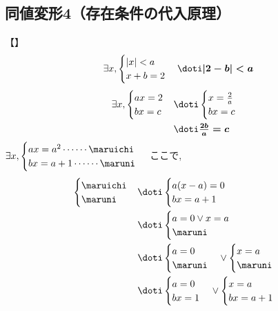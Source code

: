 \documentclass[10pt,fleqn,a4paper]{jsarticle}
\newcommand{\ans}[1]{\mbox{\boldmath{$#1$}}}
\newcommand{\theme}[1]{【\text{#1}】}
\begin{document}
\subsection{同値変形4（存在条件の代入原理）}
\noindent{}\theme{計算練習}\\
\kakkoichib\begin{align*}
  \exists x,\begin{cases}
    |x|<a\\
    x+b=2
  \end{cases}\doti\ans{|2-b|<a}
\end{align*}
\kakkonib\begin{align*}
  \exists x,\begin{cases}
    ax=2\\
    bx=c
  \end{cases}&\doti\begin{cases}
    x=\frac{2}{a}\\
    bx=c
  \end{cases}\\
  &\doti\ans{\frac{2b}{a}=c}
\end{align*}
\kakkosanb
$\exists x,\begin{cases}
    ax=a^2\cdots\cdots\maruichi\\
    bx=a+1\cdots\cdots\maruni
\end{cases}$
ここで,\begin{align*}
  \begin{cases}
    \maruichi\\
    \maruni
  \end{cases}&\doti\begin{cases}
    a(x-a)=0\\
    bx=a+1
  \end{cases}\\
  &\doti\begin{cases}
    a=0\vee x=a\\
    \maruni
  \end{cases}\\
  &\doti\begin{cases}
    a=0\\
    \maruni
  \end{cases}\vee\begin{cases}
    x=a\\
    \maruni
  \end{cases}\\
  &\doti\begin{cases}
    a=0\\
    bx=1
  \end{cases}\vee\begin{cases}
    x=a\\
    bx=a+1
  \end{cases}
\end{align*}
\end{document}
